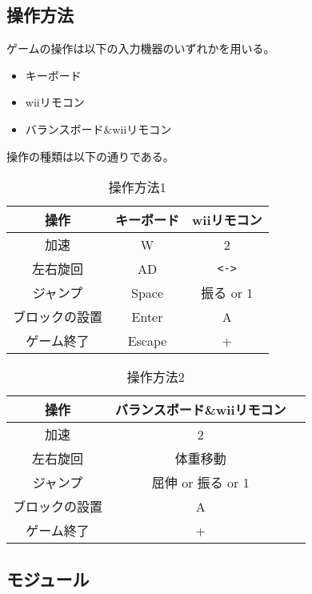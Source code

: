 \documentclass{jarticle}
\begin{document}
\clearpage
\subsection{操作方法}
ゲームの操作は以下の入力機器のいずれかを用いる。
\begin{itemize}
    \item キーボード
    \item wiiリモコン
    \item バランスボード\&wiiリモコン
\end{itemize}

操作の種類は以下の通りである。
\begin{table}[H]
    \caption{操作方法1}
    \label{table:control1}
    \begin{center}
    \begin{tabular}{|c|c|c|}\hline
    操作 & キーボード & wiiリモコン\\ \hline
    加速 & W & 2 \\ \hline
    左右旋回 & AD & \verb+<->+ \\ \hline
    ジャンプ & Space & 振る or 1 \\ \hline
    ブロックの設置 & Enter & A \\ \hline
    ゲーム終了 & Escape& + \\\hline
    
    \end{tabular}
    \end{center}
\end{table}

\begin{table}[H]
    \caption{操作方法2}
    \label{table:control2}
    \begin{center}
    \begin{tabular}{|c|c|c|}\hline
    操作 & バランスボード\&wiiリモコン\\ \hline
    加速 & 2 \\ \hline
    左右旋回 & 体重移動 \\ \hline
    ジャンプ & 屈伸 or 振る or 1 \\ \hline
    ブロックの設置 & A \\ \hline
    ゲーム終了 & + \\\hline
    \end{tabular}
    \end{center}
\end{table}



\subsection{モジュール}
\end{document}

